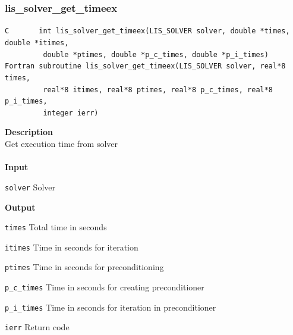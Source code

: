 \documentclass[a4paper]{article}
\newcommand{\namelistlabel}[1]{\mbox{#1}\hfill}
\newenvironment{namelist}[1]{%
 \begin{list}{}
  {\let\makelabel\namelistlabel
  \settowidth{\labelwidth}{#1}
  \setlength{\leftmargin}{1.1\labelwidth}}
}{%
\end{list}}
\begin{document}
  \subsubsection{lis\_solver\_get\_timeex}
\begin{screen}
\verb|C       int lis_solver_get_timeex(LIS_SOLVER solver, double *times, double *itimes,|\\
\verb|         double *ptimes, double *p_c_times, double *p_i_times)|\\
\verb|Fortran subroutine lis_solver_get_timeex(LIS_SOLVER solver, real*8 times,|\\
\verb|         real*8 itimes, real*8 ptimes, real*8 p_c_times, real*8 p_i_times,|\\
\verb|         integer ierr)|
\end{screen}
{\bf Description}\\
\indent
Get execution time from solver
\\ \\
\noindent
{\bf Input}
\begin{namelist}{XXXXXXXXXXXXXXXXXXXX}
\item[\tt solver] Solver
\end{namelist}
{\bf Output}
\begin{namelist}{XXXXXXXXXXXXXXXXXXXX}
\item[\tt times] Total time in seconds
\item[\tt itimes] Time in seconds for iteration
\item[\tt ptimes] Time in seconds for preconditioning
\item[\tt p\_c\_times] Time in seconds for creating preconditioner
\item[\tt p\_i\_times] Time in seconds for iteration in preconditioner
\item[\tt ierr] Return code
\end{namelist}
\end{document}
